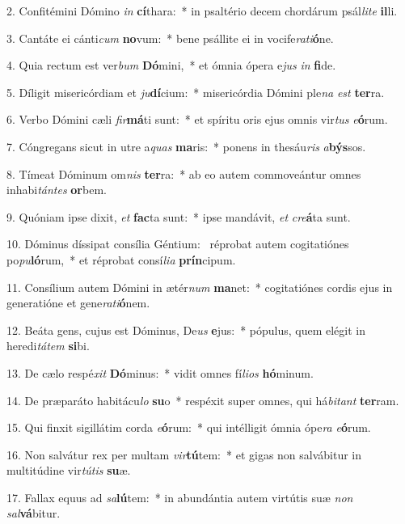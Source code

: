 2. Confitémini Dómino \textit{in} \textbf{cí}thara:~*  in psaltério decem chordárum psál\textit{li}\textit{te} \textbf{il}li.\

3. Cantáte ei cánti\textit{cum} \textbf{no}vum:~*  bene psállite ei in vocife\textit{ra}\textit{ti}\textbf{ó}ne.\

4. Quia rectum est ver\textit{bum} \textbf{Dó}mini,~*  et ómnia ópera e\textit{jus} \textit{in} \textbf{fi}de.\

5. Díligit misericórdiam et \textit{ju}\textbf{dí}cium:~*  misericórdia Dómini ple\textit{na} \textit{est} \textbf{ter}ra.\

6. Verbo Dómini cæli \textit{fir}\textbf{má}ti sunt:~*  et spíritu oris ejus omnis vir\textit{tus} \textit{e}\textbf{ó}rum.\

7. Cóngregans sicut in utre a\textit{quas} \textbf{ma}ris:~*  ponens in thesáu\textit{ris} \textit{a}\textbf{býs}sos.\

8. Tímeat Dóminum om\textit{nis} \textbf{ter}ra:~*  ab eo autem commoveántur omnes inhabi\textit{tán}\textit{tes} \textbf{or}bem.\

9. Quóniam ipse dixit, \textit{et} \textbf{fac}ta sunt:~*  ipse mandávit, \textit{et} \textit{cre}\textbf{á}ta sunt.\

10. Dóminus díssipat consília Géntium: \dag\  réprobat autem cogitatiónes po\textit{pu}\textbf{ló}rum,~*  et réprobat consí\textit{li}\textit{a} \textbf{prín}cipum.\

11. Consílium autem Dómini in ætér\textit{num} \textbf{ma}net:~*  cogitatiónes cordis ejus in generatióne et gene\textit{ra}\textit{ti}\textbf{ó}nem.\

12. Beáta gens, cujus est Dóminus, De\textit{us} \textbf{e}jus:~*  pópulus, quem elégit in heredi\textit{tá}\textit{tem} \textbf{si}bi.\

13. De cælo respé\textit{xit} \textbf{Dó}minus:~*  vidit omnes fí\textit{li}\textit{os} \textbf{hó}minum.\

14. De præparáto habitácu\textit{lo} \textbf{su}o~*  respéxit super omnes, qui há\textit{bi}\textit{tant} \textbf{ter}ram.\

15. Qui finxit sigillátim corda \textit{e}\textbf{ó}rum:~*  qui intélligit ómnia ópe\textit{ra} \textit{e}\textbf{ó}rum.\

16. Non salvátur rex per multam \textit{vir}\textbf{tú}tem:~*  et gigas non salvábitur in multitúdine vir\textit{tú}\textit{tis} \textbf{su}æ.\

17. Fallax equus ad \textit{sa}\textbf{lú}tem:~*  in abundántia autem virtútis suæ \textit{non} \textit{sal}\textbf{vá}bitur.\

